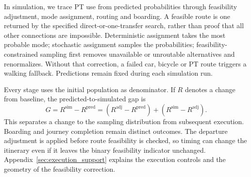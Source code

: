 In simulation, we trace PT use from predicted probabilities through feasibility adjustment, mode assignment, routing and boarding. A feasible route is one returned by the specified direct-or-one-transfer search, rather than proof that all other connections are impossible. Deterministic assignment takes the most probable mode; stochastic assignment samples the probabilities; feasibility-constrained sampling first removes unavailable or unroutable alternatives and renormalizes. Without that correction, a failed car, bicycle or PT route triggers a walking fallback. Predictions remain fixed during each simulation run.

Every stage uses the initial population as denominator. If $R$ denotes a change from baseline, the predicted-to-simulated gap is
\begin{equation}
G=R^{\mathrm{sim}}-R^{\mathrm{pred}}
=(R^{\mathrm{adj}}-R^{\mathrm{pred}})+(R^{\mathrm{sim}}-R^{\mathrm{adj}}).
\label{eq:execution_decomposition}
\end{equation}
This separates a change to the sampling distribution from subsequent execution. Boarding and journey completion remain distinct outcomes. The departure adjustment is applied before route feasibility is checked, so timing can change the itinerary even if it leaves the binary feasibility indicator unchanged. Appendix~\ref{sec:execution_support} explains the execution controls and the geometry of the feasibility correction.
